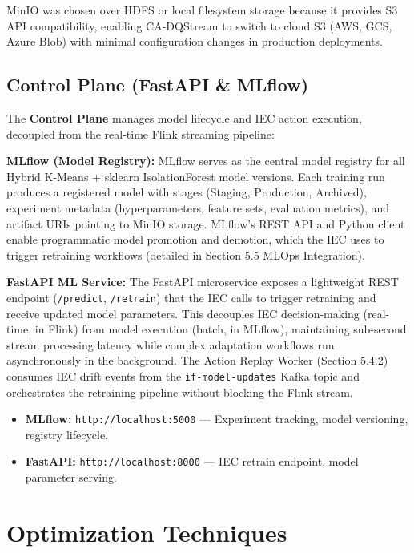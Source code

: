 MinIO was chosen over HDFS or local filesystem storage because it provides S3 API compatibility, enabling CA-DQStream to switch to cloud S3 (AWS, GCS, Azure Blob) with minimal configuration changes in production deployments.

\subsection{Control Plane (FastAPI \& MLflow)}

The \textbf{Control Plane} manages model lifecycle and IEC action execution, decoupled from the real-time Flink streaming pipeline:

\textbf{MLflow (Model Registry):} MLflow serves as the central model registry for all Hybrid K-Means + sklearn IsolationForest model versions. Each training run produces a registered model with stages (Staging, Production, Archived), experiment metadata (hyperparameters, feature sets, evaluation metrics), and artifact URIs pointing to MinIO storage. MLflow's REST API and Python client enable programmatic model promotion and demotion, which the IEC uses to trigger retraining workflows (detailed in Section 5.5 MLOps Integration).

\textbf{FastAPI ML Service:} The FastAPI microservice exposes a lightweight REST endpoint (\texttt{/predict}, \texttt{/retrain}) that the IEC calls to trigger retraining and receive updated model parameters. This decouples IEC decision-making (real-time, in Flink) from model execution (batch, in MLflow), maintaining sub-second stream processing latency while complex adaptation workflows run asynchronously in the background. The Action Replay Worker (Section 5.4.2) consumes IEC drift events from the \texttt{if-model-updates} Kafka topic and orchestrates the retraining pipeline without blocking the Flink stream.

\begin{itemize}
    \item \textbf{MLflow:} \texttt{http://localhost:5000} --- Experiment tracking, model versioning, registry lifecycle.
    \item \textbf{FastAPI:} \texttt{http://localhost:8000} --- IEC retrain endpoint, model parameter serving.
\end{itemize}

\section{Optimization Techniques}


